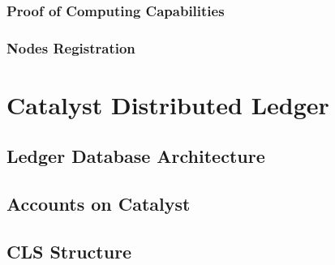 \documentclass[a4paper, 12pt]{article}
\begin{document}
\subsubsection{Proof of Computing Capabilities}\label{Sec:Pcc}



\subsubsection{Nodes Registration}\label{Sec:Reg}




%



 \newpage
 
\section{Catalyst Distributed Ledger} \label{Cha:LDA}


\subsection{Ledger Database Architecture} \label{Sec:LDA}



\subsection{Accounts on Catalyst} \label{Sec:AoC}



\subsection{CLS Structure}\label{SecLCS}
\end{document}
